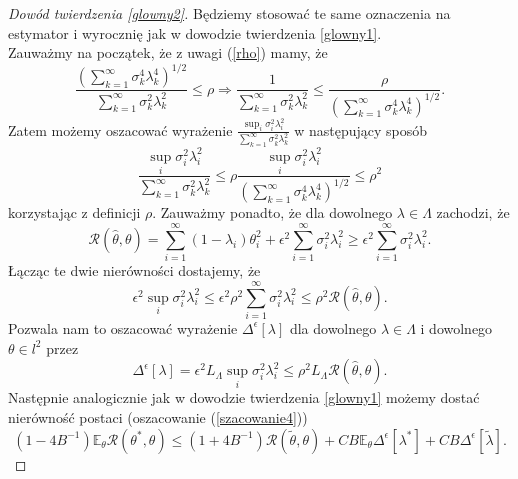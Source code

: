 \documentclass{article}
\begin{document}
\begin{proof}[Dowód twierdzenia \ref{glowny2}]
Będziemy stosować te same oznaczenia na estymator i wyrocznię jak w dowodzie twierdzenia \ref{glowny1}.\\
Zauważmy na początek, że z uwagi (\ref{rho}) mamy, że 
\begin{displaymath}
\frac{\left(\sum_{k=1}^{\infty}\sigma_k^4\lambda_k^4\right)^{1/2}}{\sum_{k=1}^{\infty}\sigma_k^2\lambda_k^2}\leq \rho \Longrightarrow \frac{1}{\sum_{k=1}^{\infty}\sigma_k^2\lambda_k^2}\leq \frac{\rho}{\left(\sum_{k=1}^{\infty}\sigma_k^4\lambda_k^4\right)^{1/2}}.
\end{displaymath}
Zatem możemy oszacować wyrażenie $\frac{\sup_i \sigma_i^2\lambda_i^2}{\sum_{k=1}^{\infty}\sigma_k^2\lambda_k^2}$ w następujący sposób
\begin{displaymath}
\frac{\sup_i \sigma_i^2\lambda_i^2}{\sum_{k=1}^{\infty}\sigma_k^2\lambda_k^2}\leq \rho \frac{\sup_i \sigma_i^2\lambda_i^2}{\left(\sum_{k=1}^{\infty}\sigma_k^4\lambda_k^4\right)^{1/2}}\leq \rho^2
\end{displaymath}
korzystając z definicji $\rho$. Zauważmy ponadto, że dla dowolnego $\lambda\in \Lambda$ zachodzi, że
\begin{displaymath}
\mathcal{R}(\hat{\theta},\theta)=\sum_{i=1}^{\infty}(1-\lambda_i)\theta^2_i+\epsilon^2\sum_{i=1}^{\infty}\sigma_i^2\lambda_i^2\geq \epsilon^2\sum_{i=1}^{\infty}\sigma_i^2\lambda_i^2.
\end{displaymath}
Łącząc te dwie nierówności dostajemy, że
\begin{displaymath}
\epsilon^2\sup_i \sigma_i^2\lambda_i^2\leq \epsilon^2\rho^2\sum_{i=1}^{\infty}\sigma_i^2\lambda_i^2\leq \rho^2\mathcal{R}(\hat{\theta},\theta).
\end{displaymath}
Pozwala nam to oszacować wyrażenie $\Delta^{\epsilon}[\lambda]$ dla dowolnego $\lambda\in \Lambda$ i dowolnego $\theta\in l^2$ przez
\begin{displaymath}
\Delta^{\epsilon}[\lambda]=\epsilon^2L_{\Lambda}\sup_i \sigma_i^2\lambda_i^2\leq \rho^2L_{\Lambda}\mathcal{R}(\hat{\theta},\theta).
\end{displaymath}
Następnie analogicznie jak w dowodzie twierdzenia \ref{glowny1} możemy dostać nierówność postaci (oszacowanie (\ref{szacowanie4}))
\begin{displaymath}
(1-4B^{-1})\mathbb{E}_{\theta}\mathcal{R}(\theta^*,\theta)\leq (1+4B^{-1})\mathcal{R}(\tilde{\theta},\theta)+CB\mathbb{E}_{\theta}\Delta^{\epsilon}[\lambda^*]+CB\Delta^{\epsilon}[\tilde{\lambda}].
\end{displaymath}

\end{proof}
\end{document}
